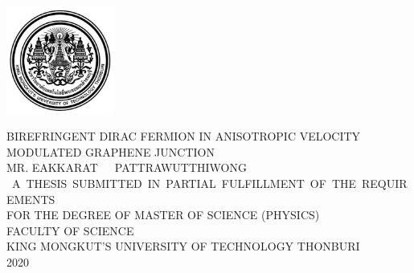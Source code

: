 \centerline{\includegraphics[width=1.4in]{logo.jpg}}
\begin{center}
        {{\large\mbox BIREFRINGENT DIRAC FERMION IN ANISOTROPIC VELOCITY MODULATED GRAPHENE JUNCTION
}}\\
       \vspace*{6.75cm}
        {{\small\mbox   MR. EAKKARAT~~~PATTRAWUTTHIWONG}} \\
       {\small\vspace*{6.75cm}
               {\mbox{ A THESIS SUBMITTED IN PARTIAL FULFILLMENT OF THE REQUIREMENTS}\\
               FOR THE DEGREE OF MASTER OF SCIENCE  (PHYSICS) \\
                FACULTY OF SCIENCE\\
                KING MONGKUT'S UNIVERSITY OF TECHNOLOGY THONBURI\\
               2020}
        }
\end{center}
